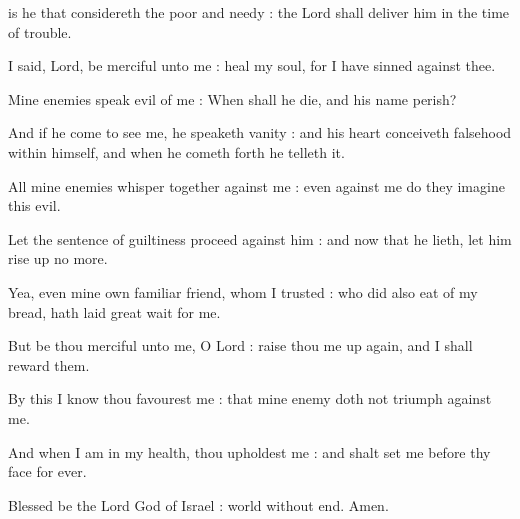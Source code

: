 

 is he that considereth the poor and needy : the Lord shall deliver him in the time of trouble.\par
{}
I said, Lord, be merciful unto me : heal my soul, for I have sinned against thee.\par
{}Mine enemies speak evil of me : When shall he die, and his name perish?\par
{}And if he come to see me, he speaketh vanity : and his heart conceiveth falsehood within himself, and when he cometh forth he telleth it.\par
{}All mine enemies whisper together against me : even against me do they imagine this evil.\par
{}Let the sentence of guiltiness proceed against him : and now that he lieth, let him rise up no more.\par
{}Yea, even mine own familiar friend, whom I trusted : who did also eat of my bread, hath laid great wait for me.\par
{}But be thou merciful unto me, O Lord : raise thou me up again, and I shall reward them.\par
{}By this I know thou favourest me : that mine enemy doth not triumph against me.\par
{}And when I am in my health, thou upholdest me : and shalt set me before thy face for ever.\par
{}Blessed be the Lord God of Israel : world without end. Amen.\par


